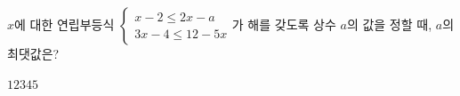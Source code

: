 $x$에 대한 연립부등식 $\begin{cases} x-2\le 2x-a \\ 3x-4\le 12-5x \end{cases}$가 해를 갖도록 상수 $a$의 값을 정할 때, $a$의 최댓값은?
\begin{choices32}{$1$}{$2$}{$3$}{$4$}{$5$}\end{choices32}
